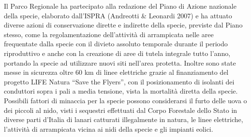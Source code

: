 Il Parco Regionale ha partecipato alla redazione del Piano di Azione
nazionale della specie, elaborato dall{\textquoteright}ISPRA (Andreotti
\& Leonardi 2007) e ha attuato diverse azioni di conservazione dirette
e indirette della specie, previste dal Piano stesso, come la
regolamentazione dell{\textquoteright}attivit\`a di arrampicata nelle
aree frequentate dalla specie con il divieto assoluto temporale durante
il periodo riproduttivo e anche con la creazione di aree di tutela
integrale tutto l{\textquoteright}anno, portando la specie ad
utilizzare nuovi siti nell{\textquoteright}area protetta. Inoltre sono
state messe in sicurezza oltre 60 km di linee elettriche grazie al
finanziamento del progetto LIFE Natura {\textquotedblleft}Save the
Flyers{\textquotedblright}, con il posizionamento di isolanti dei
conduttori sopra i pali a media tensione, vista la mortalit\`a diretta
della specie. Possibili fattori di minaccia per la specie possono
considerarsi il furto delle uova o dei piccoli al nido, visti i
sequestri effettuati dal Corpo Forestale dello Stato in diverse parti d{\textquoteright}Italia
di lanari catturati illegalmente in natura, le linee elettriche,
l{\textquoteright}attivit\`a di arrampicata vicina ai nidi della specie
e gli impianti eolici.



